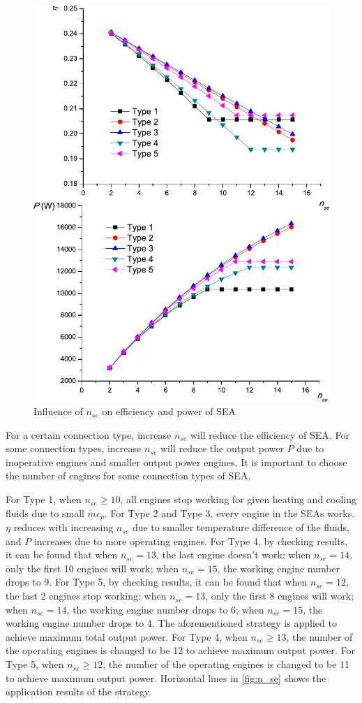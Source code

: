 \begin{figure}[htbp]
\centering
	\includegraphics[width = 0.7\columnwidth]{fig/n_se}
	\caption{Influence of $n_{se}$ on efficiency and power of SEA}
	\label{fig:n_se}
\end{figure}

For a certain connection type, increase $n_{se}$ will reduce the efficiency of SEA. For some connection types, increase $n_{se}$ will reduce the output power $P$ due to inoperative engines and smaller output power engines. It is important to choose the number of engines for some connection types of SEA. 

For Type 1, when $n_{se} \geqslant 10$, all engines stop working for given heating and cooling fluids due to small $\dot{m}c_p$. For Type 2 and Type 3, every engine in the SEAs works. $\eta$ reduces with increasing $n_{se}$ due to smaller temperature difference of the fluids, and $P$ increases due to more operating engines. For Type 4, by checking results, it can be found that when $n_{se} = 13$,  the last engine doesn't work; when $n_{se} = 14$, only the first 10 engines will work; when $n_{se} = 15$, the working engine number drops to 9. For Type 5, by checking results, it can be found that when $n_{se} = 12$, the last 2 engines stop working; when $n_{se} = 13$, only the first 8 engines will work; when $n_{se} = 14$, the working engine number drops to 6; when $n_{se} = 15$, the working engine number drops to 4. The aforementioned strategy is applied to achieve maximum total output power. For Type 4, when $n_{se} \geqslant 13$, the number of the operating engines is changed to be 12 to achieve maximum output power. For Type 5, when $n_{se} \geqslant 12$, the number of the operating engines is changed to be 11 to achieve maximum output power.
Horizontal lines in \autoref{fig:n_se} shows the application results of the strategy. 


